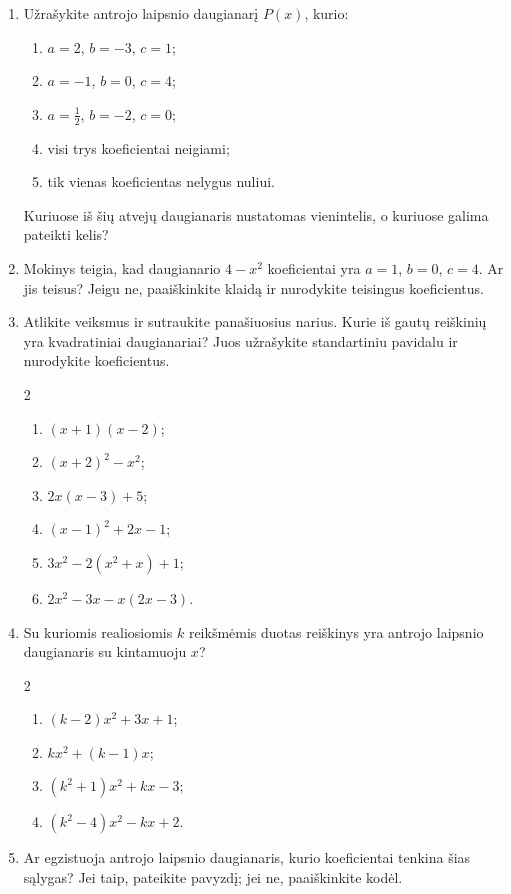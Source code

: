 \documentclass[12pt,a4paper]{exam}
\begin{document}
\begin{enumerate}
\item Užrašykite antrojo laipsnio daugianarį $P(x)$, kurio:
\begin{enumerate}
\item $a=2$, $b=-3$, $c=1$;
\item $a=-1$, $b=0$, $c=4$;
\item $a=\frac{1}{2}$, $b=-2$, $c=0$;
\item visi trys koeficientai neigiami;
\item tik vienas koeficientas nelygus nuliui.
\end{enumerate}
Kuriuose iš šių atvejų daugianaris nustatomas vienintelis, o kuriuose galima pateikti kelis?
\item Mokinys teigia, kad daugianario $4-x^2$ koeficientai yra $a=1$, $b=0$, $c=4$. Ar jis teisus? Jeigu ne, paaiškinkite klaidą ir nurodykite teisingus koeficientus.
\item Atlikite veiksmus ir sutraukite panašiuosius narius. Kurie iš gautų reiškinių yra kvadratiniai daugianariai? Juos užrašykite standartiniu pavidalu ir nurodykite koeficientus.
\begin{multicols}{2}
\begin{enumerate}
\item $(x+1)(x-2)$;
\item $(x+2)^2-x^2$;
\item $2x(x-3)+5$;
\item $(x-1)^2+2x-1$;
\item $3x^2-2(x^2+x)+1$;
\item $2x^2-3x-x(2x-3)$.
\end{enumerate}
\end{multicols}
\item Su kuriomis realiosiomis $k$ reikšmėmis duotas reiškinys yra antrojo laipsnio daugianaris su kintamuoju $x$?
\begin{multicols}{2}
\begin{enumerate}
\item $(k-2)x^2+3x+1$;
\item $kx^2+(k-1)x$;
\item $(k^2+1)x^2+kx-3$;
\item $(k^2-4)x^2-kx+2$.
\end{enumerate}
\end{multicols}
\item Ar egzistuoja antrojo laipsnio daugianaris, kurio koeficientai tenkina šias sąlygas? Jei taip, pateikite pavyzdį; jei ne, paaiškinkite kodėl.
\begin{enumerate}

\end{enumerate}
\end{enumerate}
\end{document}
